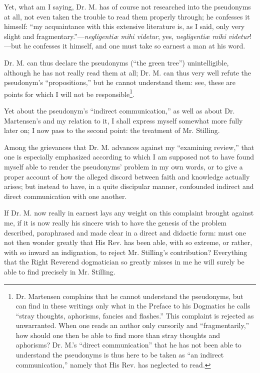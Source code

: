\documentclass[12pt,a4paper,openany]{book}
\newcommand{\opage}[1]{\marginnote{\footnotesize\textit{[#1]}}}
\begin{document}
Yet, what am I saying, Dr. M. has of course not researched
into the pseudonyms at all, not even taken the trouble to
read them properly through; he confesses it himself: ``my
acquaintance with this extensive literature is, as I said, only
very slight and fragmentary.''---\textit{negligentiæ mihi videtur},
yes, \textit{negligentiæ mihi videtur}!---but he confesses it
himself, and one must take so earnest a man at his word.

Dr. M. can thus declare the pseudonyms (``the green
\setcounter{footnote}{0}%
\opage{13}tree'') unintelligible, although he has not really
read them at all; Dr. M. can thus very well refute the pseudonym's
``propositions,'' but he cannot understand them: see, these are
points for which I will not be responsible\footnote[1]{Dr. Martensen complains that he cannot understand the pseudonyms, but can find in these writings only what in the Preface to his Dogmatics he calls ``stray thoughts, aphorisms, fancies and flashes.'' This complaint is rejected as unwarranted. When one reads an author only cursorily and ``fragmentarily,'' how should one then be able to find more than stray thoughts and aphorisms? Dr. M.'s ``direct communication'' that he has not been able to understand the pseudonyms is thus here to be taken as ``an indirect communication,'' namely that His Rev. has neglected to read.}.

Yet about the pseudonym's ``indirect communication,'' as well
as about Dr. Martensen's and my relation to it, I shall
express myself somewhat more fully later on; I now pass to
the second point: the treatment of Mr. Stilling.

Among the grievances that Dr. M. advances against my
``examining review,'' that one is especially emphasized according to which I am
supposed not to have found myself able to render the pseudonyms'
problem in my own words, or to give a proper account
of how the alleged discord between faith and knowledge
actually arises; but instead to have, in a quite discipular
manner, confounded indirect and direct communication
with one another.

If Dr. M. now really in earnest lays any
weight on this complaint brought against me, if it is now
really his sincere wish to have the genesis of the problem
described, paraphrased and made clear in a direct
and didactic form: must one not then wonder greatly
that His Rev. has been able, with so extreme, or rather, with so inward
an indignation, to reject Mr. Stilling's
\setcounter{footnote}{0}%
\opage{14}contribution? Everything that the Right Reverend dogmatician so greatly
misses in me he will surely be able to find precisely in Mr.
Stilling.
\end{document}
